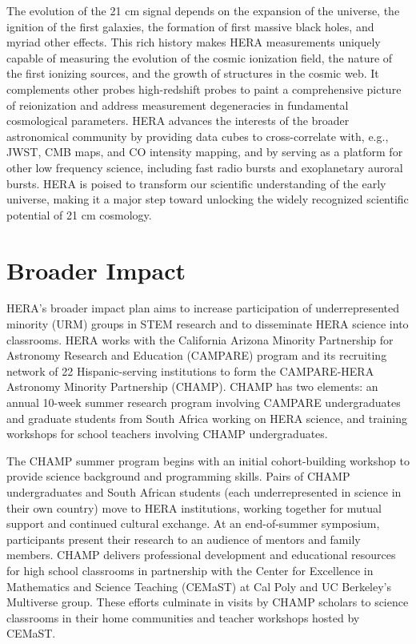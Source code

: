 \documentclass[preprint]{aastex}
\begin{document}
The evolution of the 21 cm signal depends on the expansion of the universe, the ignition of the first galaxies, the formation of first massive black holes, and myriad other effects.  This rich history makes HERA measurements uniquely capable of measuring the evolution of the cosmic ionization field, the nature of the first ionizing sources, and the growth of structures in the cosmic web.  It complements other probes high-redshift probes to paint a comprehensive picture of reionization and address measurement degeneracies in fundamental cosmological parameters.  HERA advances the interests of the broader astronomical community by providing data cubes to cross-correlate with, e.g., JWST, CMB maps, and CO intensity mapping, and by serving as a platform for other low frequency science, including fast radio bursts and exoplanetary auroral bursts.  HERA is poised to transform our scientific understanding of the early universe, making it a major step toward unlocking the widely recognized scientific potential of 21 cm cosmology.

\section*{Broader Impact}

HERA's broader impact plan aims to increase participation of underrepresented minority (URM) groups in STEM research and to disseminate HERA science into classrooms. HERA works with the California Arizona Minority Partnership for Astronomy Research and Education (CAMPARE) program and its recruiting network of 22 Hispanic-serving institutions to form the CAMPARE-HERA Astronomy Minority Partnership (CHAMP). CHAMP has two elements: an annual 10-week summer research program involving CAMPARE undergraduates and graduate students from South Africa working on HERA science, and training workshops for school teachers involving CHAMP undergraduates.

The CHAMP summer program begins with an initial cohort-building workshop to provide science background and programming skills. Pairs of CHAMP undergraduates and South African students (each underrepresented in science in their own country) move to HERA institutions, working together for mutual support and continued cultural exchange. At an end-of-summer symposium, participants present their research to an audience of mentors and family members. CHAMP delivers professional development and educational resources for high school classrooms in partnership with the Center for Excellence in Mathematics and Science Teaching (CEMaST) at Cal Poly and UC Berkeley's Multiverse group.  These efforts culminate in visits by CHAMP scholars to science classrooms in their home communities and teacher workshops hosted by CEMaST.
\end{document}
